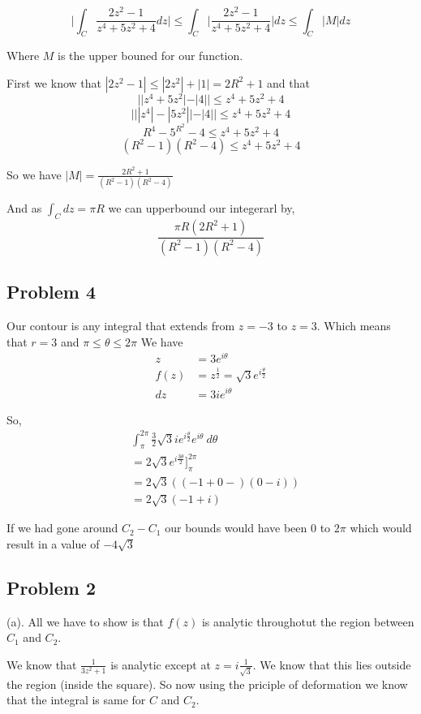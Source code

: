 \documentclass[a4paper]{report}
\begin{document}
$$ \bigg | \int_C \frac{2z^2 - 1}{z^{4} + 5z^2 + 4} dz\bigg | \le \int_C \bigg | \frac{2z^2 - 1}{z^{4} + 5z^2 + 4}\bigg | dz \le \int_C | M | dz$$ 

Where $M$ is the upper bouned for our function.

First we know that $|2z^2 - 1|\le  |2z^2| + |1| = 2R^2 + 1$ and that 
$$ ||z^{4} + 5z^2| - |4||  \le z^{4} + 5z^2 + 4$$ 
$$  |||z^{4}| - |5z^2|| - |4|| \le z^{4} + 5z^2  + 4$$ 
$$ R^{4} - 5^{R^2} - 4 \le z^{4}+ 5z^2 + 4 $$ 
$$ (R^2 - 1)(R^2 - 4) \le z^{4}+ 5z^2 + 4 $$ 

So we have $|M| = \frac{2R^2 + 1}{(R^2 - 1)(R^2 - 4)}$ 

And as $\int_C dz = \pi R$ we can upperbound our integerarl by, 
$$ \frac{\pi R (2R^2 + 1)}{(R^2 - 1)(R^2 - 4)} $$ 


\subsection*{Problem 4}
Our contour is any integral that extends from $z = -3$ to $z = 3$. Which  means that $r = 3$ and $\pi \le \theta \le 2\pi$
We have 
\begin{align*}
    z &= 3e^{i\theta}\\
    f(z) &= z^{\frac{1}{2}} = \sqrt{3} e^{i\frac{\theta}{2}}\\
    dz &= 3ie^{i\theta}
\end{align*}

So, 
\begin{align*}
&\int_{\pi}^{2\pi} \frac{3}{2}\sqrt{3}i e^{i\frac{\theta}{2}}e^{i\theta} \: d\theta\\
&= 2 \sqrt{3} e^{i\frac{3\theta}{2}}]_{\pi}^{2\pi}\\
&= 2\sqrt{3} ((-1 + 0 -)( 0 - i))\\
&= 2\sqrt{3}(-1 + i)
\end{align*}

If we had gone around $C_2-C_1$ our bounds would have been $0$ to $2\pi$ which would result in a value of $-4\sqrt{3}$



\subsection*{Problem 2}
(a). All we have to show is that $f(z)$ is analytic throughotut the region between $C_1$ and $C_2$. 

We know that $\frac{1}{3z^2+1}$ is analytic except at $z = i\frac{1}{\sqrt{3}}$. We know that this lies outside the region (inside the square). So now using the priciple of deformation we know that the integral is same for $C$ and $C_2$.
\end{document}
